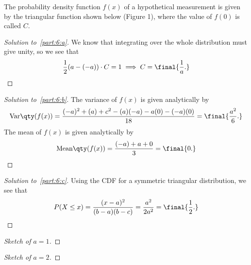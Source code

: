 \documentclass[10pt, physics]{homework}
\begin{document}
	\begin{problem}[12pts]
		The probability density function $f(x)$ of a hypothetical measurement is given by the triangular function shown below (Figure 1), where the value of $f(0)$ is called $C$. 
	\end{problem}
	\begin{proof}[Solution to~\ref{part:6:a}]
		We know that integrating over the whole distribution must give unity, so we see that 
		\[ \frac{1}{2}(a - (-a))\cdot C = 1 \implies C = \final{\frac{1}{a}.}\qedhere \]
	\end{proof}
	\begin{proof}[Solution to~\ref{part:6:b}]
		The variance of $f(x)$ is given analytically by
		\[ \text{Var}\qty(f(x)) = \frac{(-a)^2 + (a) + c^2 - (a)(-a) - a(0) - (-a)(0)}{18} = \final{\frac{a^2}{6}.} \]
		The mean of $f(x)$ is given analytically by 
		\[ \text{Mean}\qty(f(x)) = \frac{(-a) + a + 0}{3} = \final{0.}\qedhere \]
	\end{proof}
	\begin{proof}[Solution to~\ref{part:6:c}]
		Using the CDF for a symmetric triangular distribution, we see that 
		\[ P(X \leq x) = \frac{(x-a)^2}{(b-a)(b-c)} = \frac{a^2}{2a^2} = \final{\frac{1}{2}.}\qedhere \]
	\end{proof}
	\begin{proof}[Sketch of $a=1$]
		\vspace{5cm}
	\end{proof}
	\begin{proof}[Sketch of $a=2$]
		\vspace{5cm}
	\end{proof}
\end{document}

